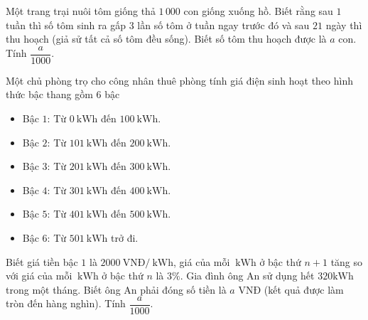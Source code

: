 \begin{bt}%
 
	Một trang trại nuôi tôm giống thả $1\,000$ con giống xuống hồ. Biết rằng sau $1$ tuần thì số tôm sinh ra gấp $3$ lần số tôm ở tuần ngay trước đó và sau $21$ ngày thì thu hoạch (giả sử tất cả số tôm đều sống). Biết số tôm thu hoạch được là $a$ con. Tính $\dfrac{a}{1000}$.
\end{bt}

\begin{bt}%
 
	Một chủ phòng trọ cho công nhân thuê phòng tính giá điện sinh hoạt theo hình thức bậc thang gồm $6$ bậc
	\begin{itemize}
		\item Bậc $1$: Từ $0\mathrm{~kWh}$ đến $100 \mathrm{~kWh}$.
		\item Bậc $2$: Từ $101\mathrm{~kWh}$ đến $200 \mathrm{~kWh}$.
		\item Bậc $3$: Từ $201\mathrm{~kWh}$ đến $300\mathrm{~kWh}$.
		\item  Bậc $4$: Từ $301\mathrm{~kWh}$ đến $400 \mathrm{~kWh}$.
		\item Bậc $5$: Từ $401\mathrm{~kWh}$ đến $500 \mathrm{~kWh}$.
		\item  Bậc $6$: Từ $501 \mathrm{~kWh}$ trở đi.
	\end{itemize}    
	Biết giá tiền bậc $1$ là $2000 \mathrm{~VNĐ}/ \mathrm{~kWh}$, giá của mỗi $\mathrm{~kWh}$ ở bậc thứ $n+1$ tăng so với giá của mỗi $\mathrm{~kWh}$ ở bậc thứ $n$ là $3 \%$. Gia đình ông An sử dụng hết $320 \mathrm{kWh}$ trong một tháng. Biết ông An phải đóng số tiền là $a$ VNĐ (kết quả được làm tròn đến hàng nghìn). Tính $\dfrac{a}{1000}$. 
\end{bt}

